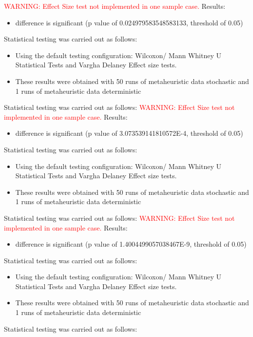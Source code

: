 \documentclass[]{article}
\begin{document}
\textcolor{Red}{WARNING: Effect Size test not implemented in one sample case.
}
Results:
\begin{itemize}
\item{difference is significant (p value of 0.024979583548583133, threshold of 0.05)}
\end{itemize}Statistical testing was carried out as follows: \begin{itemize}
\item{Using the default testing configuration: Wilcoxon/ Mann Whitney U Statistical Tests and Vargha Delaney Effect size tests.}
\item{These results were obtained with 50 runs of metaheuristic data stochastic and 1 runs of metaheuristic data deterministic}
\end{itemize}Statistical testing was carried out as follows: 
\textcolor{Red}{WARNING: Effect Size test not implemented in one sample case.
}
Results:
\begin{itemize}
\item{difference is significant (p value of 3.073539141810572E-4, threshold of 0.05)}
\end{itemize}Statistical testing was carried out as follows: \begin{itemize}
\item{Using the default testing configuration: Wilcoxon/ Mann Whitney U Statistical Tests and Vargha Delaney Effect size tests.}
\item{These results were obtained with 50 runs of metaheuristic data stochastic and 1 runs of metaheuristic data deterministic}
\end{itemize}Statistical testing was carried out as follows: 
\textcolor{Red}{WARNING: Effect Size test not implemented in one sample case.
}
Results:
\begin{itemize}
\item{difference is significant (p value of 1.4004499057038467E-9, threshold of 0.05)}
\end{itemize}Statistical testing was carried out as follows: \begin{itemize}
\item{Using the default testing configuration: Wilcoxon/ Mann Whitney U Statistical Tests and Vargha Delaney Effect size tests.}
\item{These results were obtained with 50 runs of metaheuristic data stochastic and 1 runs of metaheuristic data deterministic}
\end{itemize}Statistical testing was carried out as follows: 
\end{document}
